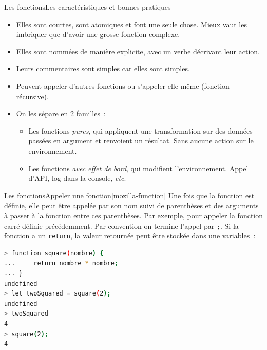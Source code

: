 \documentclass{beamer}
\begin{document}
    \begin{frame}{Les fonctions}{Les caractéristiques et bonnes pratiques}
        \begin{itemize}
            \item Elles sont courtes, sont atomiques et font une seule chose. Mieux vaut les
            imbriquer que d'avoir une grosse fonction complexe.
            \item Elles sont nommées de manière explicite, avec un verbe décrivant leur action.
            \item Leurs commentaires sont simples car elles sont simples.
            \item Peuvent appeler d'autres fonctions ou s'appeler elle-même (fonction récursive).
            \item On les sépare en 2 familles~:
            \begin{itemize}
                \item Les fonctions \textit{pures}, qui appliquent une transformation sur des données
                passées en argument et renvoient un résultat.
                Sans aucune action sur le environnement.
                \item Les fonctions \textit{avec effet de bord}, qui modifient l'environnement.
                Appel d'API, log dans la console, \textit{etc}.
            \end{itemize}
        \end{itemize}
    \end{frame}

    \begin{frame}[fragile]{Les fonctions}{Appeler une fonction\cref{mozilla-function}}
        Une fois que la fonction est définie, elle peut être appelée par son nom suivi de parenthèses et des arguments à passer à la fonction entre ces parenthèses.
        Par exemple, pour appeler la fonction carré définie précédemment.
        Par convention on termine l'appel par \lstinline{;}.
        Si la fonction a un \lstinline{return}, la valeur retournée peut être stockée dans une variables~:
        \begin{lstlisting}[language=Bash,title={\scriptsize{Node.js}}]
> function square(nombre) {
...     return nombre * nombre;
... }
undefined
> let twoSquared = square(2);
undefined
> twoSquared
4
> square(2);
4
        \end{lstlisting}
    \end{frame}
\end{document}

